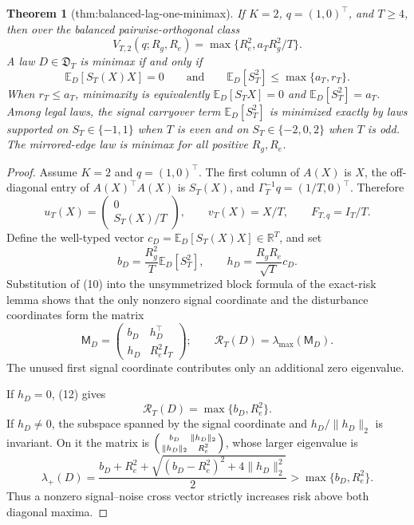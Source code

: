 \documentclass{article}
\newtheorem{theorem}{Theorem}
\begin{document}
\begin{theorem}[thm:balanced-lag-one-minimax]\label{thm:balanced-lag-one-minimax}
If \(K=2\), \(q=(1,0)^{\top}\), and \(T\ge4\), then over the balanced pairwise-orthogonal class
\[
V_{T,2}(q;R_g,R_e)=\max\{R_e^2,a_TR_g^2/T\}.
\]
A law \(D\in\mathfrak D_T\) is minimax if and only if
\[
\mathbb E_D[S_T(X)X]=0
\qquad\text{and}\qquad
\mathbb E_D[S_T^2]\le\max\{a_T,r_T\}.
\]
When \(r_T\le a_T\), minimaxity is equivalently \(\mathbb E_D[S_TX]=0\) and \(\mathbb E_D[S_T^2]=a_T\).  Among legal laws, the signal carryover term \(\mathbb E_D[S_T^2]\) is minimized exactly by laws supported on \(S_T\in\{-1,1\}\) when \(T\) is even and on \(S_T\in\{-2,0,2\}\) when \(T\) is odd.  The mirrored-edge law is minimax for all positive \(R_g,R_e\).
\end{theorem}
\begin{proof}
Assume \(K=2\) and \(q=(1,0)^{\top}\).  The first column of \(A(X)\) is \(X\), the off-diagonal entry of \(A(X)^{\top}A(X)\) is \(S_T(X)\), and \(\Gamma_T^{-1}q=(1/T,0)^{\top}\).  Therefore
\[
u_T(X)=\begin{pmatrix}0\\S_T(X)/T\end{pmatrix},
\qquad
v_T(X)=X/T,
\qquad
F_{T,q}=I_T/T.
\tag{10}
\]
Define the well-typed vector \(c_D=\mathbb E_D[S_T(X)X]\in\mathbb R^T\), and set
\[
b_D=\frac{R_g^2}{T}\mathbb E_D[S_T^2],
\qquad
h_D=\frac{R_gR_e}{\sqrt T}c_D.
\tag{11}
\]
Substitution of (10) into the unsymmetrized block formula of the exact-risk lemma shows that the only nonzero signal coordinate and the disturbance coordinates form the matrix
\[
\mathsf M_D=
\begin{pmatrix}
b_D&h_D^{\top}\\
h_D&R_e^2I_T
\end{pmatrix};
\qquad
\mathcal R_T(D)=\lambda_{\max}(\mathsf M_D).
\tag{12}
\]
The unused first signal coordinate contributes only an additional zero eigenvalue.

If \(h_D=0\), (12) gives
\[
\mathcal R_T(D)=\max\{b_D,R_e^2\}.
\tag{13}
\]
If \(h_D\ne0\), the subspace spanned by the signal coordinate and \(h_D/\lVert h_D\rVert_2\) is invariant.  On it the matrix is
\(
\begin{psmallmatrix}b_D&\lVert h_D\rVert_2\\\lVert h_D\rVert_2&R_e^2\end{psmallmatrix}
\), whose larger eigenvalue is
\[
\lambda_+(D)=
\frac{b_D+R_e^2+\sqrt{(b_D-R_e^2)^2+4\lVert h_D\rVert_2^2}}{2}
>\max\{b_D,R_e^2\}.
\tag{14}
\]
Thus a nonzero signal--noise cross vector strictly increases risk above both diagonal maxima.


\end{proof}
\end{document}
